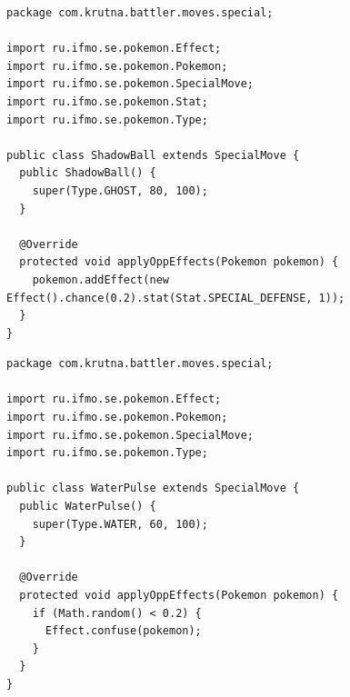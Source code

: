 \documentclass[11pt]{article}
\begin{document}
\begin{lstlisting}
package com.krutna.battler.moves.special;

import ru.ifmo.se.pokemon.Effect;
import ru.ifmo.se.pokemon.Pokemon;
import ru.ifmo.se.pokemon.SpecialMove;
import ru.ifmo.se.pokemon.Stat;
import ru.ifmo.se.pokemon.Type;

public class ShadowBall extends SpecialMove {
  public ShadowBall() {
    super(Type.GHOST, 80, 100);
  }

  @Override
  protected void applyOppEffects(Pokemon pokemon) {
    pokemon.addEffect(new Effect().chance(0.2).stat(Stat.SPECIAL_DEFENSE, 1));
  }
}
\end{lstlisting}
\begin{lstlisting}
package com.krutna.battler.moves.special;

import ru.ifmo.se.pokemon.Effect;
import ru.ifmo.se.pokemon.Pokemon;
import ru.ifmo.se.pokemon.SpecialMove;
import ru.ifmo.se.pokemon.Type;

public class WaterPulse extends SpecialMove {
  public WaterPulse() {
    super(Type.WATER, 60, 100);
  }

  @Override
  protected void applyOppEffects(Pokemon pokemon) {
    if (Math.random() < 0.2) {
      Effect.confuse(pokemon);
    }
  }
}
\end{lstlisting}
\end{document}
